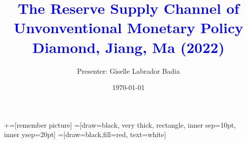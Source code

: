 \documentclass[notes,11pt, aspectratio=169]{beamer}
\title[]{\textcolor{blue}{The Reserve Supply Channel of Unvonventional Monetary Policy \\ Diamond, Jiang, Ma (2022)}}
\author{ Presenter: Giselle Labrador Badia}
\date{\today}
\begin{document}
\newcommand\marktopleft[1]{%
    \tikz[overlay,remember picture] 
        \node (marker-#1-a) at (-.3em,.3em) {};%
}
\newcommand\markbottomright[2]{%
    \tikz[overlay,remember picture] 
        \node (marker-#1-b) at (0em,0em) {};%
}
+=[remember picture] 
 =[draw=black, very thick, rectangle, inner sep=10pt, inner ysep=20pt]
 =[draw=black,fill=red, text=white]

\begin{frame}
  \maketitle
\end{frame}




    




  
\end{document}
